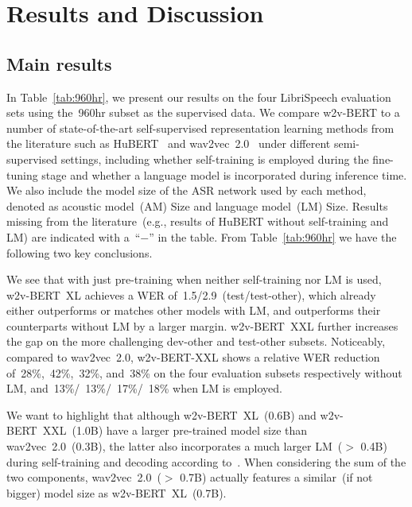 \documentclass{article}
\begin{document}
\section{Results and Discussion}
\label{sec:results}

\subsection{Main results}
In Table~\ref{tab:960hr}, we present our results on the four LibriSpeech evaluation sets using the~960hr subset as the supervised data.
We compare w2v-BERT to a number of state-of-the-art self-supervised representation learning methods from the literature such as HuBERT~\cite{hsu2021hubert} and wav2vec~2.0~\cite{baevski2020wav2vec} under different semi-supervised settings, including whether self-training is employed during the fine-tuning stage and whether a language model is incorporated during inference time.
We also include the model size of the ASR network used by each method, denoted as acoustic model~(AM) Size and language model~(LM) Size.
Results missing from the literature~(e.g., results of HuBERT without self-training and LM) are indicated with a~``$-$'' in the table.
From Table~\ref{tab:960hr} we have the following two key conclusions.

We see that with just pre-training when neither self-training nor LM is used, w2v-BERT~XL achieves a WER of~1.5/2.9~(test/test-other), which already either outperforms or matches other models with LM, and outperforms their counterparts without LM by a larger margin.
w2v-BERT~XXL further increases the gap on the more challenging dev-other and test-other subsets.
Noticeably, compared to wav2vec~2.0, w2v-BERT-XXL shows a relative WER reduction of~28\%,~42\%,~32\%, and~38\% on the four evaluation subsets respectively without LM, and~13\%/~13\%/~17\%/~18\% when LM is employed.

We want to highlight that although w2v-BERT~XL~(0.6B) and w2v-BERT~XXL~(1.0B) have a larger pre-trained model size than wav2vec~2.0~(0.3B), the latter also incorporates a much larger LM~($>$ 0.4B) during self-training and decoding according to~\cite{xu2021self,baevski2020wav2vec}.
When considering the sum of the two components, wav2vec~2.0~($>$ 0.7B) actually features a similar~(if not bigger) model size as w2v-BERT~XL~(0.7B).
\end{document}
